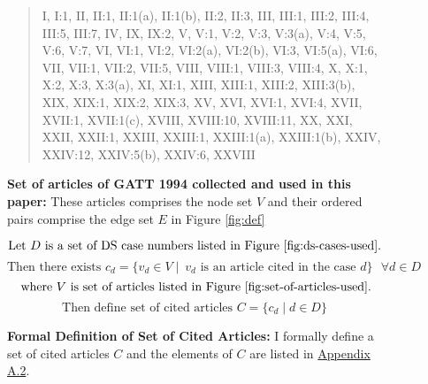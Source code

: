 \begin{figure}[h]
    \begin{quote}
    I, 
    I:1, 
    II, 
    II:1, 
    II:1(a), 
    II:1(b), 
    II:2, 
    II:3, 
    III, 
    III:1, 
    III:2, 
    III:4, 
    III:5, 
    III:7, 
    IV, 
    IX, 
    IX:2, 
    V, 
    V:1, 
    V:2, 
    V:3, 
    V:3(a), 
    V:4, 
    V:5, 
    V:6, 
    V:7, 
    VI, 
    VI:1, 
    VI:2, 
    VI:2(a), 
    VI:2(b), 
    VI:3, 
    VI:5(a), 
    VI:6, 
    VII, 
    VII:1, 
    VII:2, 
    VII:5, 
    VIII, 
    VIII:1, 
    VIII:3, 
    VIII:4, 
    X, 
    X:1, 
    X:2, 
    X:3, 
    X:3(a), 
    XI, 
    XI:1, 
    XIII, 
    XIII:1, 
    XIII:2, 
    XIII:3(b), 
    XIX, 
    XIX:1, 
    XIX:2, 
    XIX:3, 
    XV, 
    XVI, 
    XVI:1, 
    XVI:4, 
    XVII, 
    XVII:1, 
    XVII:1(c), 
    XVIII, 
    XVIII:10, 
    XVIII:11, 
    XX, 
    XXI, 
    XXII, 
    XXII:1, 
    XXIII, 
    XXIII:1, 
    XXIII:1(a), 
    XXIII:1(b), 
    XXIV, 
    XXIV:12, 
    XXIV:5(b), 
    XXIV:6, 
    XXVIII
    \end{quote}
    \caption{
        \textbf{
            Set of articles of GATT 1994 collected and used in this paper: 
            }These articles comprises the node set $V$ and their ordered pairs comprise the edge set $E$ in Figure \ref{fig:def}
        }
    \label{fig:set-of-articles-used}
\end{figure}

\begin{figure}[ht]
    \[\text{Let } D \text{ is a set of DS case numbers listed in Figure \ref{fig:ds-cases-used}.} \] %
    \[\text{Then there exists } c_d = \{v_d \in V \mid\ v_d \text{ is an article cited in the case } d\} \text{ } \forall d \in D \]
    \[\text{ where } V \text{ is set of articles listed in Figure \ref{fig:set-of-articles-used}}.\]
    \[\text{Then define set of cited articles } C = \{c_d \mid d \in D\}\]
    \caption{\textbf{Formal Definition of Set of Cited Articles: }I formally define a set of cited articles $C$ and the elements of $C$ are listed in \hyperref[sub:cited-articles-table]{Appendix A.2}.}
    \label{fig:def:set-of-cited-articles}
\end{figure}


